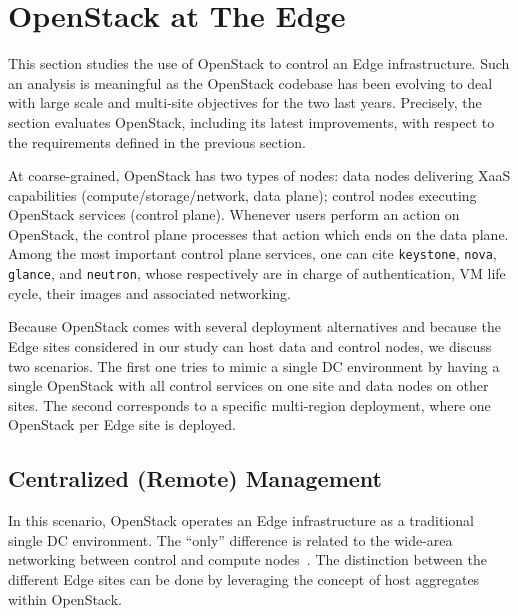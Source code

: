 \section{OpenStack at The Edge}
\label{sec:system_design_considerations}
%
This section studies the use of OpenStack to control an Edge
infrastructure. Such an analysis is meaningful as the OpenStack
codebase has been evolving to deal with large scale and multi-site
objectives for the two last years. Precisely, the section evaluates
OpenStack, including its latest improvements, with respect to the requirements
defined in the previous section.


At coarse-grained, OpenStack has two types of nodes: data nodes
delivering XaaS capabilities (compute/storage/network, \ie data
plane); control nodes executing OpenStack services (\ie control
plane). Whenever users perform an action on OpenStack, the control
plane processes that action which ends on the data plane.  Among the
most important control plane services, one can cite \verb|keystone|,
\verb|nova|, \verb|glance|, and \verb|neutron|, whose respectively are
in charge of authentication, VM life cycle, their images and
associated networking.

Because OpenStack comes with several deployment alternatives and
because the Edge sites considered in our study can host data and
control nodes, we discuss two scenarios. The first one tries to mimic a
single DC environment by having a single OpenStack with all control
services on one site and data nodes on other sites.  The second
corresponds to a specific multi-region deployment, where one OpenStack
per Edge site is deployed.

\subsection{Centralized (Remote) Management}
\label{subsec:centralized_os}
In this scenario, OpenStack operates an Edge infrastructure
as a traditional single DC environment. %
The ``only'' difference is related to the wide-area networking between
control and compute nodes~\cite{www:openstack-wanwide}. The
distinction between the different Edge sites can be done by leveraging the
concept of host aggregates within OpenStack.

